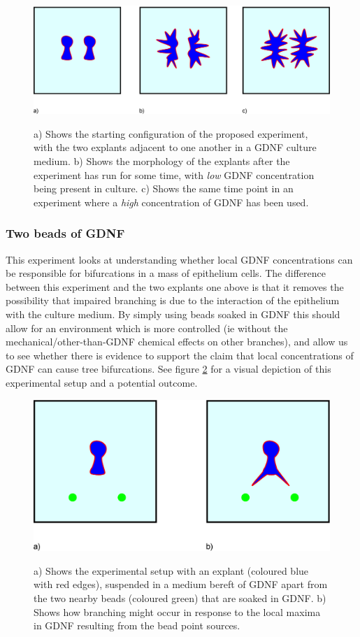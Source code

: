 \documentclass[pdftex,10pt,a4paper]{article}
\begin{document}
\begin{figure}[t] 
\centering
\scalebox{0.25} 
{\includegraphics{experiments_1.eps}}
\caption{a) Shows the starting configuration of the proposed experiment, with the two explants adjacent to one another in a GDNF culture medium. b) Shows the morphology of the explants after the experiment has run for some time, with \textit{low} GDNF concentration being present in culture. c) Shows the same time point in an experiment where a \textit{high} concentration of GDNF has been used.}\label{fig:twoexplants}
\end{figure} 

\subsubsection{Two beads of GDNF}
This experiment looks at understanding whether local GDNF concentrations can be responsible for bifurcations in a mass of epithelium cells. The difference between this experiment and the two explants one above is that it removes the possibility that impaired branching is due to the interaction of the epithelium with the culture medium. By simply using beads soaked in GDNF this should allow for an environment which is more controlled (ie without the mechanical/other-than-GDNF chemical effects on other branches), and allow us to see whether there is evidence to support the claim that local concentrations of GDNF can cause tree bifurcations. See figure \ref{fig:twobeads} for a visual depiction of this experimental setup and a potential outcome.

\begin{figure}[t] 
\centering
\scalebox{0.25} 
{\includegraphics{experiments_2.eps}}
\caption{a) Shows the experimental setup with an explant (coloured blue with red edges), suspended in a medium bereft of GDNF apart from the two nearby beads (coloured green) that are soaked in GDNF. b) Shows how branching might occur in response to the local maxima in GDNF resulting from the bead point sources.} \label{fig:twobeads}
\end{figure} 
\end{document}
